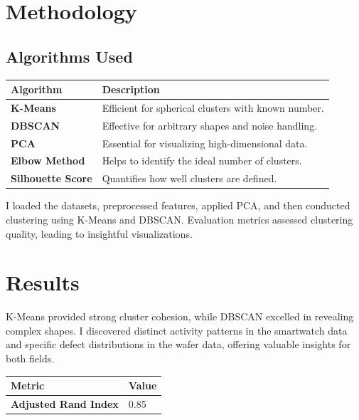 \documentclass[11pt,a4paper]{article}
\begin{document}
\section{Methodology}

\subsection{Algorithms Used}

\begin{tabularx}{\linewidth}{@{}>{\bfseries}l X @{}}
  \arrayrulecolor{tableheader}
  \toprule
  \rowcolor{tableheader} Algorithm & Description \\
  \midrule
  \rowcolor{white} K-Means & Efficient for spherical clusters with known number. \\
  \rowcolor{tablerow} DBSCAN & Effective for arbitrary shapes and noise handling. \\
  \rowcolor{white} PCA & Essential for visualizing high-dimensional data. \\
  \rowcolor{tablerow} Elbow Method & Helps to identify the ideal number of clusters. \\
  \rowcolor{white} Silhouette Score & Quantifies how well clusters are defined. \\
  \bottomrule
\end{tabularx}

I loaded the datasets, preprocessed features, applied PCA, and then conducted clustering using K-Means and DBSCAN. Evaluation metrics assessed clustering quality, leading to insightful visualizations.

\section{Results}

K-Means provided strong cluster cohesion, while DBSCAN excelled in revealing complex shapes. I discovered distinct activity patterns in the smartwatch data and specific defect distributions in the wafer data, offering valuable insights for both fields.

\vspace{4pt}

\begin{tabularx}{\linewidth}{@{}>{\bfseries}l X @{}}
  \arrayrulecolor{tableheader}
  \toprule
  \rowcolor{tableheader} Metric & Value \\
  \midrule
  \rowcolor{white} Adjusted Rand Index & 0.85 \\
  \bottomrule
\end{tabularx}
\end{document}
